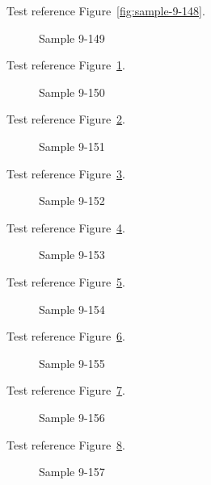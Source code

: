 Test reference Figure~\ref{fig:sample-9-148}.

\begin{figure}[tbhp]
\caption{Sample 9-149}
\label{fig:sample-9-149}
\end{figure}

Test reference Figure~\ref{fig:sample-9-149}.

\begin{figure}[tbhp]
\caption{Sample 9-150}
\label{fig:sample-9-150}
\end{figure}

Test reference Figure~\ref{fig:sample-9-150}.

\begin{figure}[tbhp]
\caption{Sample 9-151}
\label{fig:sample-9-151}
\end{figure}

Test reference Figure~\ref{fig:sample-9-151}.

\begin{figure}[tbhp]
\caption{Sample 9-152}
\label{fig:sample-9-152}
\end{figure}

Test reference Figure~\ref{fig:sample-9-152}.

\begin{figure}[tbhp]
\caption{Sample 9-153}
\label{fig:sample-9-153}
\end{figure}

Test reference Figure~\ref{fig:sample-9-153}.

\begin{figure}[tbhp]
\caption{Sample 9-154}
\label{fig:sample-9-154}
\end{figure}

Test reference Figure~\ref{fig:sample-9-154}.

\begin{figure}[tbhp]
\caption{Sample 9-155}
\label{fig:sample-9-155}
\end{figure}

Test reference Figure~\ref{fig:sample-9-155}.

\begin{figure}[tbhp]
\caption{Sample 9-156}
\label{fig:sample-9-156}
\end{figure}

Test reference Figure~\ref{fig:sample-9-156}.

\begin{figure}[tbhp]
\caption{Sample 9-157}
\label{fig:sample-9-157}
\end{figure}

